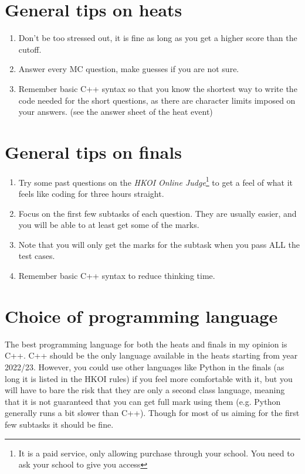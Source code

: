 \section{General tips on heats}
\begin{enumerate}
    \item Don't be too stressed out, it is fine as long as you get a higher score than the cutoff.
    \item Answer every MC question, make guesses if you are not sure.
    \item Remember basic C++ syntax so that you know the shortest way to write the code needed for the short questions, as there are character limits imposed on your answers. (see the answer sheet of the heat event)
\end{enumerate}

\section{General tips on finals}
\begin{enumerate}
    \item Try some past questions on the \textit{HKOI Online Judge}\footnote{It is a paid service, only allowing purchase through your school. You need to ask your school to give you access} to get a feel of what it feels like coding for three hours straight.
    \item Focus on the first few subtasks of each question. They are usually easier, and you will be able to at least get some of the marks.
    \item Note that you will only get the marks for the subtask when you pass ALL the test cases.
    \item Remember basic C++ syntax to reduce thinking time.
\end{enumerate}

\section{Choice of programming language}

The best programming language for both the heats and finals in my opinion is C++. C++ should be the only language available in the heats starting from year 2022/23. However, you could use other languages like Python in the finals (as long it is listed in the HKOI rules) if you feel more comfortable with it, but you will have to bare the risk that they are only a second class language, meaning that it is not guaranteed that you can get full mark using them (e.g. Python generally runs a bit slower than C++). Though for most of us aiming for the first few subtasks it should be fine.


